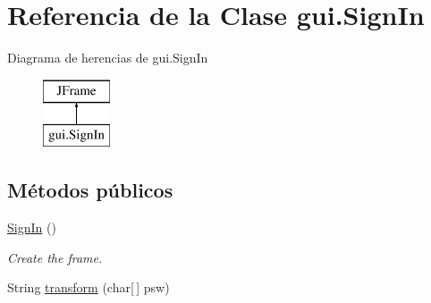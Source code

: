 \hypertarget{classgui_1_1_sign_in}{}\section{Referencia de la Clase gui.\+Sign\+In}
\label{classgui_1_1_sign_in}
Diagrama de herencias de gui.\+Sign\+In\begin{figure}[H]
\begin{center}
\leavevmode
\includegraphics[height=2.000000cm]{classgui_1_1_sign_in}
\end{center}
\end{figure}
\subsection*{Métodos públicos}
\begin{DoxyCompactItemize}
\item 
\mbox{\hyperlink{classgui_1_1_sign_in_a565fd1826fd08016ac37adcc6b8285c4}{Sign\+In}} ()
\begin{DoxyCompactList}\small\item\em Create the frame. \end{DoxyCompactList}\item 
String \mbox{\hyperlink{classgui_1_1_sign_in_a2724645e64ebe7854d178aa92f0950bb}{transform}} (char\mbox{[}$\,$\mbox{]} psw)
\end{DoxyCompactItemize}
